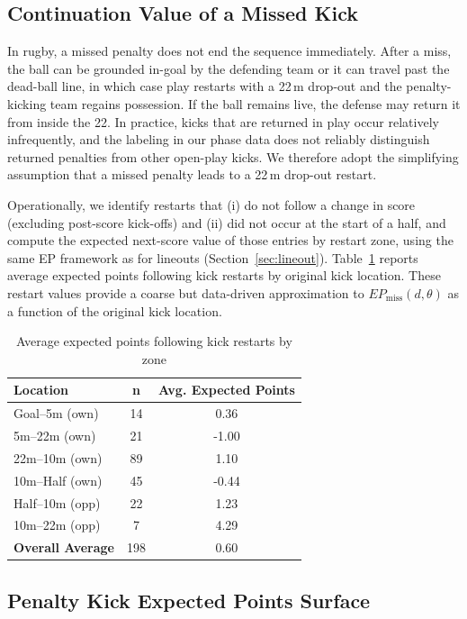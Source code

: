 \documentclass[12pt]{article}
\begin{document}
\subsection{Continuation Value of a Missed Kick}

In rugby, a missed penalty does not end the sequence immediately. After a miss, the ball can be grounded in-goal by the defending team or it can travel past the dead-ball line, in which case play restarts with a 22\,m drop-out and the penalty-kicking team regains possession. If the ball remains live, the defense may return it from inside the 22. In practice, kicks that are returned in play occur relatively infrequently, and the labeling in our phase data does not reliably distinguish returned penalties from other open-play kicks. We therefore adopt the simplifying assumption that a missed penalty leads to a 22\,m drop-out restart.

Operationally, we identify restarts that (i) do not follow a change in score (excluding post-score kick-offs) and (ii) did not occur at the start of a half, and compute the expected next-score value of those entries by restart zone, using the same EP framework as for lineouts (Section~\ref{sec:lineout}). Table~\ref{tab:ep-location} reports average expected points following kick restarts by original kick location. These restart values provide a coarse but data-driven approximation to $EP_{\text{miss}}(d, \theta)$ as a function of the original kick location.

\begin{table}[htbp]
\centering
\caption{Average expected points following kick restarts by zone}
\label{tab:ep-location}
\begin{tabular}{lcc}
\toprule
\textbf{Location} & \textbf{n} & \textbf{Avg. Expected Points} \\
\midrule
Goal--5m (own)  & 14 &  0.36 \\
5m--22m (own)   & 21 & -1.00 \\
22m--10m (own)  & 89 &  1.10 \\
10m--Half (own) & 45 & -0.44 \\
Half--10m (opp) & 22 &  1.23 \\
10m--22m (opp)  & 7  &  4.29 \\
\midrule
\textbf{Overall Average} & 198 & 0.60 \\
\bottomrule
\end{tabular}
\end{table}

\subsection{Penalty Kick Expected Points Surface}
\end{document}
